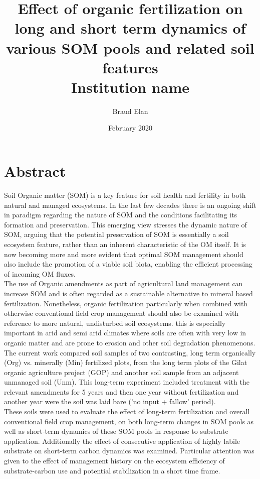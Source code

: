 \documentclass[12pt]{report}
\title{
    {Effect of organic fertilization on long and short term dynamics of various SOM pools and related soil features}\\ 
    {\large Institution name}\\
}
\author{Braud Elan }
\date{February 2020}
\begin{document}
	\maketitle

	\chapter*{Abstract}
	    Soil Organic matter (SOM) is a key feature for soil health and fertility in both natural and managed ecosystems. In the last few decades there is an ongoing shift in paradigm regarding the nature of SOM and the conditions facilitating its formation and preservation. This emerging view stresses the dynamic nature of SOM, arguing that the potential preservation of SOM is essentially a soil ecosystem feature, rather than an inherent characteristic of the OM itself. It is now becoming more and more evident that optimal SOM management should also include the promotion of a viable soil biota, enabling the efficient processing of incoming OM fluxes.  \\
	    The use of Organic amendments as part of agricultural land management can increase SOM and is often regarded as a sustainable alternative to mineral based fertilization. Nonetheless, organic fertilization particularly when combined with otherwise conventional field crop management should also be examined with reference to more natural, undisturbed soil ecosystems. this is especially important in arid and semi arid climates where soils are often with very low in organic matter and are prone to erosion and other soil degradation phenomenons.\\
	    The current work compared soil samples of two contrasting, long term organically (Org) vs. minerally (Min) fertilized plots, from the long term plots of the Gilat organic agriculture project (GOP) and another soil sample from an adjacent unmanaged soil (Unm). This long-term experiment included treatment with the relevant amendments for 5 years and then one year without fertilization and another year were the soil was laid bare ('no input + fallow' period).\\
	    These soils were used to evaluate the effect of long-term fertilization and overall conventional field crop management, on both long-term changes in SOM pools as well as short-term dynamics of these SOM pools in response to substrate application. Additionally the effect of consecutive application of highly labile substrate on short-term carbon dynamics was examined. Particular attention was given to the effect of management history on the ecosystem efficiency of substrate-carbon use and potential stabilization in a short time frame.\\
\end{document}
